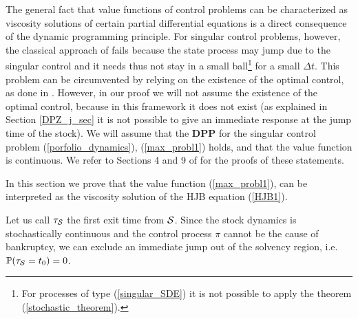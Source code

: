 The general fact that value functions of control problems can be characterized as
viscosity solutions of certain partial differential equations is a direct consequence of the dynamic
programming principle. For singular control problems, however, the classical approach of \cite{PLL83}
fails because the state process may jump due to the singular control and it needs thus not stay
in a small ball\footnote{For processes of type (\ref{singular_SDE}) it is not possible to apply the theorem (\ref{stochastic_theorem}).} 
for a small $\Delta t$.
This problem can be circumvented by relying on the
existence of the optimal control, as done in \cite{DaPaZa93}. However, in our proof we will not assume the existence of the optimal control, because 
in this framework it does not exist (as explained in Section \ref{DPZ_j_sec} it is not possible to give an immediate response at the jump time of the stock).
We will assume that the \textbf{DPP} for the singular control problem (\ref{porfolio_dynamics}), (\ref{max_probl1}) holds, and that the value function  
is continuous. We refer to Sections 4 and 9 of \cite{Kab16} for the proofs of these statements. 

In this section we prove that the value function (\ref{max_probl1}), can be interpreted 
as the viscosity solution of the HJB equation (\ref{HJB1}).

Let us call $\tau_{\mathcal{S}}$ the first exit time from $\mathcal{S}$.
Since the stock dynamics is stochastically continuous and the control process $\pi$ cannot be the cause of bankruptcy,
we can exclude an immediate jump out of the solvency region, i.e. $\mathbb{P} ( \tau_{\mathcal{S}} = t_0 ) =0$.

